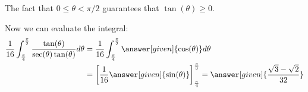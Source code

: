\documentclass{ximera}
\begin{document}
\begin{example}
\begin{explanation}
The fact that $0\leq \theta < \pi/2$ guarantees that $\tan(\theta) \geq 0$. 
 
   Now we can evaluate the integral:
    \begin{align*}
     \frac{1}{16}\int_{\frac{\pi}{4}}^{\frac{\pi}{3}} \frac{\tan(\theta)}{\sec(\theta) \tan(\theta)}  d\theta &= \frac{1}{16} \int_{\frac{\pi}{4}}^{\frac{\pi}{3}} \answer[given]{\cos(\theta)}  d\theta\\
      &= \bigg[\frac{1}{16}\answer[given]{\sin(\theta)}\bigg]_{\frac{\pi}{4}}^{\frac{\pi}{3}}= \answer[given]{\frac{\sqrt{3}-\sqrt{2}}{32}}
         \end{align*}

\end{explanation}
\end{example}

%
%
%
%
%
%
%
%
\end{document}
